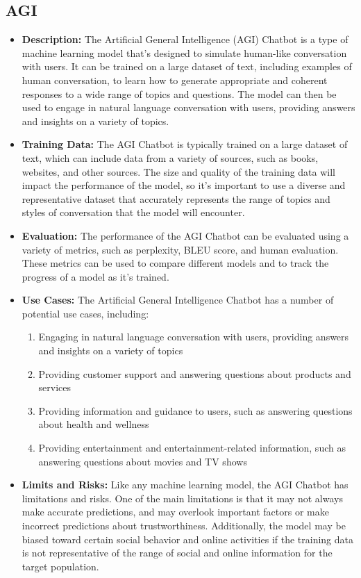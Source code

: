 \subsection{AGI}

\begin{itemize}
    \item \textbf{Description:} The Artificial General Intelligence (AGI) Chatbot is a type of machine learning model that's designed to simulate human-like conversation with users. It can be trained on a large dataset of text, including examples of human conversation, to learn how to generate appropriate and coherent responses to a wide range of topics and questions. The model can then be used to engage in natural language conversation with users, providing answers and insights on a variety of topics.
    \item \textbf{Training Data:} The AGI Chatbot is typically trained on a large dataset of text, which can include data from a variety of sources, such as books, websites, and other sources. The size and quality of the training data will impact the performance of the model, so it's important to use a diverse and representative dataset that accurately represents the range of topics and styles of conversation that the model will encounter.
    \item \textbf{Evaluation:} The performance of the AGI Chatbot can be evaluated using a variety of metrics, such as perplexity, BLEU score, and human evaluation. These metrics can be used to compare different models and to track the progress of a model as it's trained.
    \item \textbf{Use Cases:} The Artificial General Intelligence Chatbot has a number of potential use cases, including:
        \begin{enumerate}  
            \item Engaging in natural language conversation with users, providing answers and insights on a variety of topics
            \item Providing customer support and answering questions about products and services
            \item Providing information and guidance to users, such as answering questions about health and wellness
            \item Providing entertainment and entertainment-related information, such as answering questions about movies and TV shows
        \end{enumerate}
    \item \textbf{Limits and Risks:} Like any machine learning model, the AGI Chatbot has limitations and risks. One of the main limitations is that it may not always make accurate predictions, and may overlook important factors or make incorrect predictions about trustworthiness. Additionally, the model may be biased toward certain social behavior and online activities if the training data is not representative of the range of social and online information for the target population.

\end{itemize}
